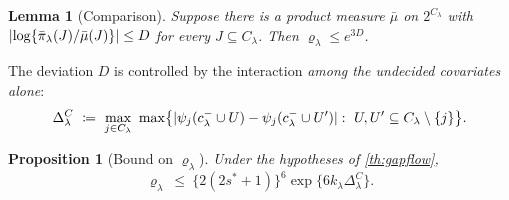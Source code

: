 \documentclass[aos]{imsart}
\DeclarePairedDelimiter{\abs}{\lvert}{\rvert}
\theoremstyle{plain}
\newtheorem{proposition}{Proposition}[section]
\newtheorem{lemma}{Lemma}[section]
\theoremstyle{definition}
\begin{document}
    \begin{lemma}[Comparison]
        \label{lemma:comparison}
        Suppose there is a product measure $\bar\mu$ on $2^{C_\lambda}$
        with $\abs{\log\{\bar\pi_\lambda(J)/\bar\mu(J)\}}\leq D$ for every
        $J\subseteq C_\lambda$. Then $\varrho_\lambda\leq e^{3D}$.
    \end{lemma}


    The deviation $D$ is controlled by the interaction \emph{among the
    undecided covariates alone}:
    \begin{equation}
        \label{eq:DeltaC}
        \Delta^{C}_\lambda\ \coloneq\ \max_{j\in C_\lambda}\
        \max\bigl\{\abs{\psi_j(c^{-}_\lambda\cup U)
            -\psi_j(c^{-}_\lambda\cup U')}:\
        U,U'\subseteq C_\lambda\setminus\{j\}\bigr\} .
    \end{equation}

    \begin{proposition}[Bound on $\varrho_\lambda$]
        \label{prop:rhobound}
        Under the hypotheses of \cref{th:gapflow},
        \begin{equation}
            \label{eq:rhobound}
            \varrho_\lambda\ \leq\ \bigl\{2(2s^{\ast}+1)\bigr\}^{6}
            \exp\bigl\{6k_\lambda\Delta^{C}_\lambda\bigr\} .
        \end{equation}
    \end{proposition}
\end{document}
